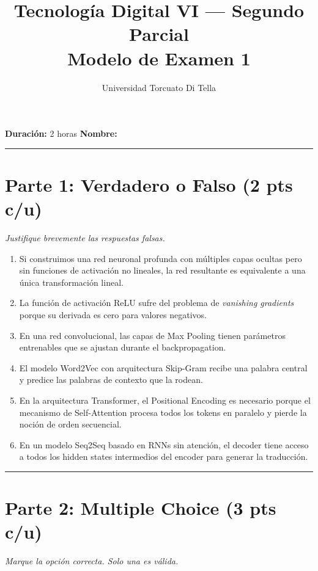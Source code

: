 \documentclass[12pt,a4paper]{article}
\title{\textbf{Tecnología Digital VI --- Segundo Parcial} \\ Modelo de Examen 1}
\author{Universidad Torcuato Di Tella}
\date{}
\begin{document}
\maketitle
\noindent\textbf{Duración:} 2 horas \hfill \textbf{Nombre:} \hrulefill

\vspace{0.5cm}
\hrule
\vspace{0.5cm}

\section*{Parte 1: Verdadero o Falso (2 pts c/u)}
\textit{Justifique brevemente las respuestas falsas.}

\begin{enumerate}[label=\alph*)]
    \item Si construimos una red neuronal profunda con múltiples capas ocultas pero sin funciones de activación no lineales, la red resultante es equivalente a una única transformación lineal.

    \item La función de activación ReLU sufre del problema de \textit{vanishing gradients} porque su derivada es cero para valores negativos.

    \item En una red convolucional, las capas de Max Pooling tienen parámetros entrenables que se ajustan durante el backpropagation.

    \item El modelo Word2Vec con arquitectura Skip-Gram recibe una palabra central y predice las palabras de contexto que la rodean.

    \item En la arquitectura Transformer, el Positional Encoding es necesario porque el mecanismo de Self-Attention procesa todos los tokens en paralelo y pierde la noción de orden secuencial.

    \item En un modelo Seq2Seq basado en RNNs sin atención, el decoder tiene acceso a todos los hidden states intermedios del encoder para generar la traducción.
\end{enumerate}

\vspace{0.5cm}
\hrule
\vspace{0.5cm}

\section*{Parte 2: Multiple Choice (3 pts c/u)}
\textit{Marque la opción correcta. Solo una es válida.}
\end{document}
